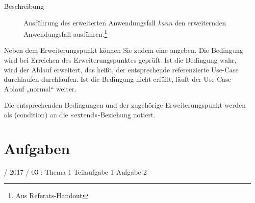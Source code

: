 \documentclass{lehramt-informatik-haupt}
\begin{document}
\begin{description}
\begin{description}
\item[Beschreibung]

Ausführung des erweiterten Anwendungsfall \emph{kann} den erweiternden
Anwendungsfall ausführen.\footnote{Aus Referats-Handout}
\end{description}


Neben dem Erweiterungspunkt können Sie zudem eine  angeben. Die Bedingung wird bei Erreichen des
Erweiterungspunktes geprüft. Ist die Bedingung wahr, wird der
Ablauf erweitert, das heißt, der entsprechende referenzierte Use-Case
durchlaufen durchlaufen. Ist die Bedingung nicht erfüllt, läuft der
Use-Case-Ablauf „normal“ weiter.

Die entsprechenden Bedingungen und der zugehörige Erweiterungspunkt
werden als  (condition) an die «extend»-Beziehung
notiert.

\begin{center}
\end{center}

\end{description}


\chapter{Aufgaben}

%

 / 2017 / 03 : Thema 1 Teilaufgabe 1 Aufgabe 2

\literatur
\end{document}
